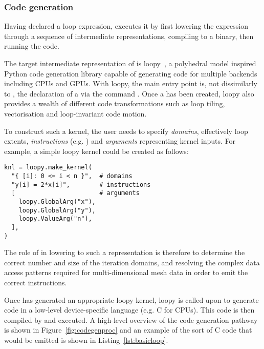 \subsubsection{Code generation}
\label{sec:impl_interface_codegen}

Having declared a loop expression,  executes it by first lowering the expression through a sequence of intermediate representations, compiling to a binary, then running the code.

The target intermediate representation of  is loopy~\cite{klocknerLooPyTransformationbased2014}, a polyhedral model inspired Python code generation library capable of generating code for multiple backends including CPUs and GPUs.
With loopy, the main entry point is, not dissimilarly to , the declaration of a  via the command .
Once a  has been created, loopy also provides a wealth of different code transformations such as loop tiling, vectorisation and loop-invariant code motion.

To construct such a kernel, the user needs to specify \textit{domains}, effectively loop extents, \textit{instructions} (e.g. ) and \textit{arguments} representing kernel inputs.
For example, a simple loopy kernel could be created as follows:

\vspace{1em}
\begin{minipage}{\textwidth}
\begin{verbatim}
knl = loopy.make_kernel(
  "{ [i]: 0 <= i < n }",  # domains
  "y[i] = 2*x[i]",        # instructions
  [                       # arguments
    loopy.GlobalArg("x"),
    loopy.GlobalArg("y"),
    loopy.ValueArg("n"),
  ],
)
\end{verbatim}
\end{minipage}
\vspace{1em}

The role of  in lowering to such a representation is therefore to determine the correct number and size of the iteration domains, and resolving the complex data access patterns required for multi-dimensional mesh data in order to emit the correct instructions.

Once  has generated an appropriate loopy kernel, loopy is called upon to generate code in a low-level device-specific language (e.g. C for CPUs).
This code is then compiled by  and executed.
A high-level overview of the code generation pathway is shown in Figure~\ref{fig:codegenproc} and an example of the sort of C code that would be emitted is shown in Listing~\ref{lst:basicloop}.

